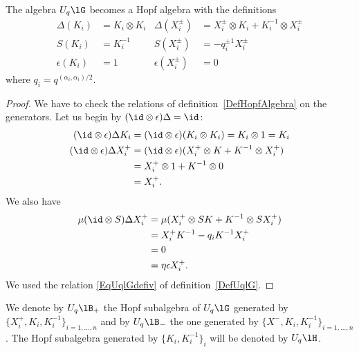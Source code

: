 \begin{proposition}
	The algebra \( U_q\lG\) becomes a Hopf algebra with the definitions
	\begin{subequations}
		\begin{align}
			\Delta(K_i)   & =K_i\otimes K_i & \Delta(X_i^{\pm})   & =X_i^{\pm}\otimes K_i+K_i^{-1}\otimes X_i^{\pm}     \\
			S(K_i)        & =K_i^{-1}       & S(X_i^{\pm})        & =-q_i^{\pm 1}X_i^{\pm}        \label{subEqantpUqGl} \\
			\epsilon(K_i) & =1              & \epsilon(X_i^{\pm}) & =0
		\end{align}
	\end{subequations}
	where \( q_i=q^{(\alpha_i,\alpha_i)/2}\).
\end{proposition}

\begin{proof}
	We have to check the relations of definition~\ref{DefHopfAlgebra} on the generators. Let us begin by \( (\id\otimes\epsilon)\Delta=\id \):
	\begin{subequations}
		\begin{align}
			(\id\otimes\epsilon)\Delta K_i   & =(\id\otimes\epsilon )(K_i\otimes K_i)=K_i\otimes 1=K_i   \\
			(\id\otimes\epsilon)\Delta X_i^+ & =(\id\otimes\epsilon)(X_i^+\otimes K+K^{-1}\otimes X_i^+) \\
			                                 & =X_i^+\otimes 1+K^{-1}\otimes 0                           \\
			                                 & =X_i^+.
		\end{align}
	\end{subequations}
	We also have
	\begin{subequations}
		\begin{align}
			\mu(\id\otimes S)\Delta X_i^+ & =\mu(X_i^+\otimes SK+K^{-1}\otimes SX_i^+) \\
			                              & =X_i^+K^{-1}-q_iK^{-1}X_i^+                \\
			                              & =0                                         \\
			                              & =\eta\epsilon X_i^+.
		\end{align}
	\end{subequations}
	We used the relation \eqref{EqUqlGdefiv} of definition~\ref{DefUqlG}.
\end{proof}

We denote by \( U_q\lB_+\) the Hopf subalgebra of \( U_q\lG\) generated by \( \{ X_i^+,K_i,K_i^{-1} \}_{i=1,\ldots,n}\) and by \( U_q\lB_-\) the one generated by \( \{ X^-,K_i,K_i^{-1} \}_{i=1,\ldots,n}\). The Hopf subalgebra generated by \( \{ K_i,K_i^{-1} \}_i\) will be denoted by \( U_q\lH\).

